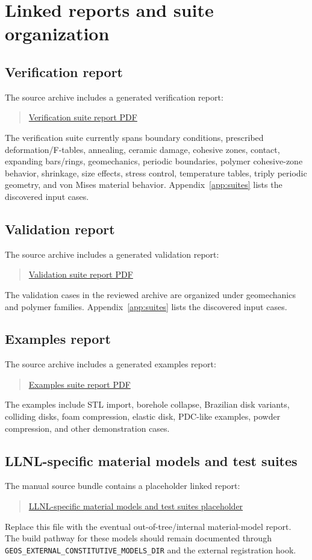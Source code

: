 \chapter{Linked reports and suite organization}
\label{ch:linked-reports}

\section{Verification report}
The source archive includes a generated verification report:
\begin{quote}
\href{linked_reports/verification_suite_report.pdf}{Verification suite report PDF}
\end{quote}
The verification suite currently spans boundary conditions, prescribed deformation/F-tables, annealing, ceramic damage, cohesive zones, contact, expanding bars/rings, geomechanics, periodic boundaries, polymer cohesive-zone behavior, shrinkage, size effects, stress control, temperature tables, triply periodic geometry, and von Mises material behavior.  Appendix~\ref{app:suites} lists the discovered input cases.

\section{Validation report}
The source archive includes a generated validation report:
\begin{quote}
\href{linked_reports/validation_suite_report.pdf}{Validation suite report PDF}
\end{quote}
The validation cases in the reviewed archive are organized under geomechanics and polymer families.  Appendix~\ref{app:suites} lists the discovered input cases.

\section{Examples report}
The source archive includes a generated examples report:
\begin{quote}
\href{linked_reports/examples_suite_report.pdf}{Examples suite report PDF}
\end{quote}
The examples include STL import, borehole collapse, Brazilian disk variants, colliding disks, foam compression, elastic disk, PDC-like examples, powder compression, and other demonstration cases.

\section{LLNL-specific material models and test suites}
The manual source bundle contains a placeholder linked report:
\begin{quote}
\href{linked_reports/llnl_specific_material_models_and_test_suites.pdf}{LLNL-specific material models and test suites placeholder}
\end{quote}
Replace this file with the eventual out-of-tree/internal material-model report.  The build pathway for these models should remain documented through \texttt{GEOS\_EXTERNAL\_CONSTITUTIVE\_MODELS\_DIR} and the external registration hook.

